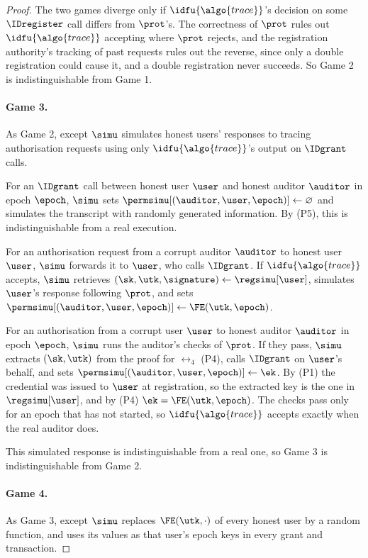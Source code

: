 \begin{proof}
  The two games diverge only if $\idfu{\algo{trace}}$'s decision on some
$\IDregister$ call differs from $\prot$'s. The correctness of $\prot$ rules out
$\idfu{\algo{trace}}$ accepting where $\prot$ rejects, and the registration
authority's tracking of past requests rules out the reverse, since only a double
registration could cause it, and a double registration never succeeds. So Game 2 is
indistinguishable from Game 1.

  \paragraph{Game 3.} As Game 2, except $\simu$ simulates honest users'
responses to tracing authorisation requests using only $\idfu{\algo{trace}}$'s
output on $\IDgrant$ calls.

  For an $\IDgrant$ call between honest user $\user$ and honest auditor
$\auditor$ in epoch $\epoch$, $\simu$ sets $\permsimu[(\auditor,\user,\epoch)]
\leftarrow \varnothing$ and simulates the transcript with randomly generated
information. By (P5), this is indistinguishable from a real execution.

  For an authorisation request from a corrupt auditor $\auditor$ to honest user
$\user$, $\simu$ forwards it to $\user$, who calls $\IDgrant$. If
$\idfu{\algo{trace}}$ accepts, $\simu$ retrieves $(\sk, \utk, \signature)
\leftarrow \regsimu[\user]$, simulates $\user$'s response following $\prot$, and
sets $\permsimu[(\auditor,\user,\epoch)] \leftarrow \FE(\utk, \epoch)$.

  For an authorisation from a corrupt user $\user$ to honest auditor
$\auditor$ in epoch $\epoch$, $\simu$ runs the auditor's checks of $\prot$. If
they pass, $\simu$ extracts $(\sk, \utk)$ from the proof for $\rel_4$ (P4), calls
$\IDgrant$ on $\user$'s behalf, and sets $\permsimu[(\auditor,\user,\epoch)]
\leftarrow \ek$. By (P1) the credential was issued to $\user$ at registration,
so the extracted key is the one in $\regsimu[\user]$, and by (P4) $\ek =
\FE(\utk, \epoch)$. The checks pass only for an epoch that has not started, so
$\idfu{\algo{trace}}$ accepts exactly when the real auditor does.

  This simulated response is indistinguishable from a real one, so Game 3 is
indistinguishable from Game 2.

  \paragraph{Game 4.} As Game 3, except $\simu$ replaces $\FE(\utk,\cdot)$ of
every honest user by a random function, and uses its values as that user's
epoch keys in every grant and transaction.


\end{proof}
